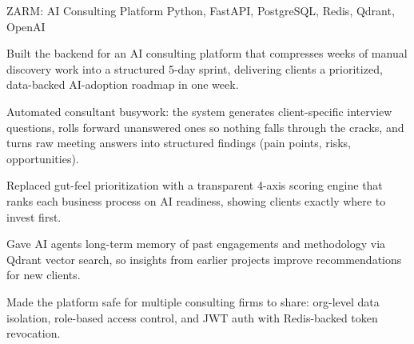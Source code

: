 \resumeSubheading
  {ZARM: AI Consulting Platform}{}
  {Python, FastAPI, PostgreSQL, Redis, Qdrant, OpenAI}{}
  \resumeItemListStart
    \item \small{Built the backend for an AI consulting platform that compresses weeks of manual discovery work into a structured 5-day sprint, delivering clients a prioritized, data-backed AI-adoption roadmap in one week.}
    \item \small{Automated consultant busywork: the system generates client-specific interview questions, rolls forward unanswered ones so nothing falls through the cracks, and turns raw meeting answers into structured findings (pain points, risks, opportunities).}
    \item \small{Replaced gut-feel prioritization with a transparent 4-axis scoring engine that ranks each business process on AI readiness, showing clients exactly where to invest first.}
    \item \small{Gave AI agents long-term memory of past engagements and methodology via Qdrant vector search, so insights from earlier projects improve recommendations for new clients.}
    \item \small{Made the platform safe for multiple consulting firms to share: org-level data isolation, role-based access control, and JWT auth with Redis-backed token revocation.}
  \resumeItemListEnd
